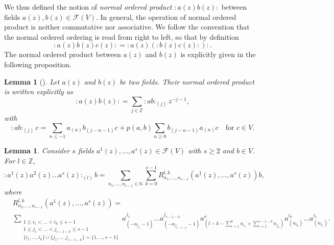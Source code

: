 \documentclass[a4paper, 12pt, reqno]{amsart}
\newtheorem{lemma}[theorem]{Lemma}
\theoremstyle{remark}
\numberwithin{equation}{subsection}
\begin{document}
We thus defined the notion of \emph{normal ordered product} $:a(z)b(z):$ between fields $a(z), b(z) \in \mathcal{F}(V)$.
In general, the operation of normal ordered product is neither commutative nor associative.
We follow the convention that the normal ordered ordering is read from right to left, so that by definition
\begin{equation*}
  :a(z)b(z)c(z): = :a(z)(:b(z)c(z):):.
\end{equation*}
The normal ordered product between $a(z)$ and $b(z)$ is explicitly given in the following proposition.

\begin{lemma}[{\cite[Proposition 3.3.3]{nozaradan_introduction_2008}}]
  \label{lmm:2}
  Let $a(z)$ and $b(z)$ be two fields.
  Their normal ordered product is written explicitly as
  \begin{equation*}
    :a(z)b(z): = \sum_{j \in \mathbb{Z}}:ab:_{(j)}z^{-j - 1},
  \end{equation*}
  with
  \begin{equation*}
    :ab:_{(j)}c = \sum_{n \le -1}a_{(n)}b_{(j - n - 1)}c + p(a, b)\sum_{n \ge 0}b_{(j - n - 1)}a_{(n)}c \quad \text{for }c \in V.
  \end{equation*}
\end{lemma}

\begin{lemma}
  \label{lmm:3}
  Consider $s$ fields $a^1(z), \dots, a^s(z) \in \mathcal{F}(V)$ with $s \ge 2$ and $b \in V$.
  For $l \in \mathbb{Z}$,
  \begin{equation*}
    :a^1(z)a^2(z)\dots a^s(z):_{(l)}b = \sum_{n_1, \dots, n_{s - 1} \in \mathbb{N}}\sum_{k = 0}^{s - 1}R^{l, k}_{n_1, \dots, n_{s - 1}}(a^1(z), \dots, a^s(z))b,
  \end{equation*}
  where
  \begin{align*}
    &R^{l, k}_{n_1, \dots, n_{s - 1}}(a^1(z), \dots, a^s(z)) = \\
    &\sum_{\substack{1 \le i_1 < \dots < i_k \le s - 1 \\ 1 \le j_1 < \dots < j_{s - 1 - k} \le s - 1 \\ \{i_1, \dots, i_k\} \cup \{j_1, \dots, j_{s - 1 - k}\} = \{1, \dots, s - 1\}}}a^{j_1}_{(-n_{j_1} - 1)}\dots a^{j_{s - 1 - k}}_{(-n_{j_{s - 1 - k}} - 1)}a^s_{(l - k - \sum_{r = 1}^k n_{i_r} + \sum_{r = 1}^{s - 1 - k}n_{j_r})}a^{i_k}_{(n_{i_k})}\dots a^{i_1}_{(n_{i_1})}.
  \end{align*}
\end{lemma}
\end{document}
